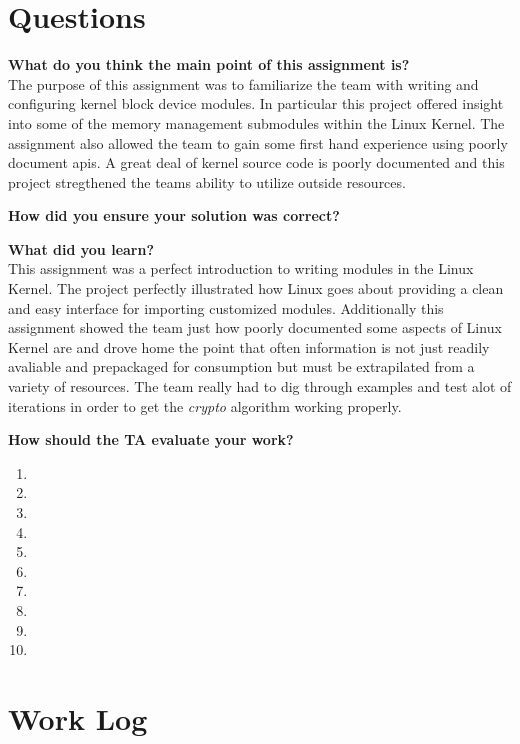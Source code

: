 \documentclass[10pt,onecolumn,draftclsnofoot]{IEEEtran} %
\begin{document}
\begin{singlespace}
\section{\bf Questions}

        \textbf{What do you think the main point of this assignment is?}\\

                \normalfont \indent The purpose of this assignment was to familiarize the team with writing and configuring kernel block device modules. In particular this project offered insight into some of the memory management submodules within the Linux Kernel. The assignment also allowed the team to gain some first hand experience using poorly document apis. A great deal of kernel source code is poorly documented and this project stregthened the teams ability to utilize outside resources. 
        
        \textbf{How did you ensure your solution was correct?}\\

                \normalfont \indent

        \textbf{What did you learn?}\\
        \normalfont \indent This assignment was a perfect introduction to writing modules in the Linux Kernel. The project perfectly illustrated how Linux goes about providing a clean and easy interface for importing customized modules. Additionally this assignment showed the team just how poorly documented some aspects of Linux Kernel are and drove home the point that often information is not just readily avaliable and prepackaged for consumption but must be extrapilated from a variety of resources. The team really had to dig through examples and test alot of iterations in order to get the \textit{crypto} algorithm working properly.

        \textbf{How should the TA evaluate your work?}\\
        
	\normalfont \indent


	\begin{enumerate}
                \item 
                \item 
                \item 
		\item
		\item
		\item
		\item
		\item
		\item
		\item
        \end{enumerate}

\newpage
\section{\bf Work Log}

                

\newpage


\end{singlespace}
\restoregeometry
\end{document}
